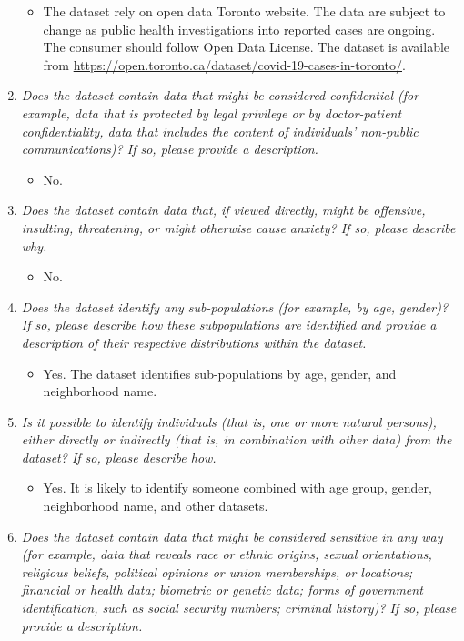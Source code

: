 \documentclass[
]{article}
\providecommand{\tightlist}{%
  \setlength{\itemsep}{0pt}\setlength{\parskip}{0pt}}
\begin{document}
\begin{enumerate}
  \begin{itemize}
  \tightlist
  \item
    The dataset rely on open data Toronto website. The data are subject to change as public health investigations into reported cases are ongoing. The consumer should follow Open Data License. The dataset is available from \url{https://open.toronto.ca/dataset/covid-19-cases-in-toronto/}.\\
  \end{itemize}
\item
  \emph{Does the dataset contain data that might be considered confidential (for example, data that is protected by legal privilege or by doctor-patient confidentiality, data that includes the content of individuals' non-public communications)? If so, please provide a description.}

  \begin{itemize}
  \tightlist
  \item
    No.
  \end{itemize}
\item
  \emph{Does the dataset contain data that, if viewed directly, might be offensive, insulting, threatening, or might otherwise cause anxiety? If so, please describe why.}

  \begin{itemize}
  \tightlist
  \item
    No.
  \end{itemize}
\item
  \emph{Does the dataset identify any sub-populations (for example, by age, gender)? If so, please describe how these subpopulations are identified and provide a description of their respective distributions within the dataset.}

  \begin{itemize}
  \tightlist
  \item
    Yes. The dataset identifies sub-populations by age, gender, and neighborhood name.
  \end{itemize}
\item
  \emph{Is it possible to identify individuals (that is, one or more natural persons), either directly or indirectly (that is, in combination with other data) from the dataset? If so, please describe how.}

  \begin{itemize}
  \tightlist
  \item
    Yes. It is likely to identify someone combined with age group, gender, neighborhood name, and other datasets.
  \end{itemize}
\item
  \emph{Does the dataset contain data that might be considered sensitive in any way (for example, data that reveals race or ethnic origins, sexual orientations, religious beliefs, political opinions or union memberships, or locations; financial or health data; biometric or genetic data; forms of government identification, such as social security numbers; criminal history)? If so, please provide a description.}


\end{enumerate}
\end{document}
